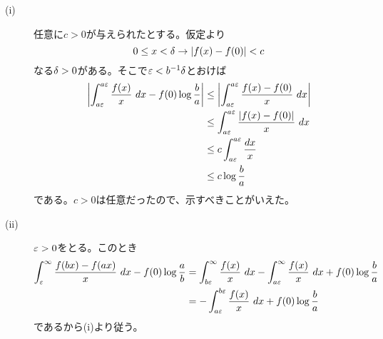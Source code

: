 \newpage


\subsubsection{}%
\barquo{
$b>a>0$を実数、$f \colon [0,\infty) \to \R$を連続関数とする。このとき以下を示せ。
\begin{description}
  \item[(i)]
  \[
  \lim_{\ve \to + 0} \int_{a \ve}^{a \ve} \f{f(x) }{x} \ dx = f(0) \log \f{b}{a}
  \]
  \item[(ii)] 広義積分$\int_{1}^{\infty} \f{f(x) }{x} \ dx$が収束するなら
  \[
  \int_{1}^{\infty} \f{f(bx) - f(ax) }{x} \ dx = f(0) \log \f{a}{b}
  \]
  が成り立つ。
\end{description}
}
\begin{sol} ${}$
\begin{description}
  \item[(i)] 任意に$c > 0$が与えられたとする。仮定より
  \[
  0 \leq x < {\delta} \to \left \lvert  f(x) - f(0) \right \rvert < c
  \]
  なる${\delta} > 0$がある。そこで${\varepsilon} < b^{-1}{\delta}$とおけば
  \begin{align*}
    \abs{ \int_{a \ve}^{a \ve} \f{f(x) }{x} \ dx - f(0) \log \f{b}{a} } &\leq \abs{ \int_{a \ve}^{a \ve} \f{f(x) -f(0) }{x} \ dx } \\
    &\leq  \int_{a \ve}^{a \ve}  \f{ \abs{ f(x) -f(0) }  }{x} \ dx  \\
    &\leq c  \int_{a \ve}^{a \ve} \f{dx}{x} \\
    &\leq c \log \f{b}{a}
  \end{align*}
  である。$c>0$は任意だったので、示すべきことがいえた。
  \item[(ii)] ${\varepsilon} > 0$をとる。このとき
  \begin{align*}
    \int_{{\varepsilon}}^{\infty} \frac{f(bx) - f(ax) }{x} \ dx - f(0) \log \frac{a}{b} &=   \int_{b {\varepsilon}}^{\infty} \frac{ f(x) }{x} \ dx -  \int_{a {\varepsilon}}^{\infty} \frac{ f(x) }{x} \ dx +  f(0) \log \frac{b}{a} \\
    &= - \int_{a {\varepsilon}}^{b {\varepsilon}} \frac{ f(x) }{x} \ dx + f(0) \log \frac{b}{a}
  \end{align*}
  であるから(i)より従う。
\end{description}
\end{sol}

\newpage


